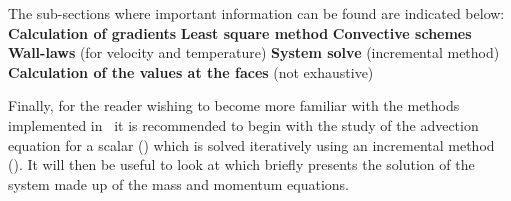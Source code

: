 The sub-sections where important information can be found are indicated
below:\newline
\newline
\nl \newline
\textbf{Calculation of gradients}\newline
\hspace*{1cm}\newline
\hspace*{1cm}\newline
\textbf{Least square method}\newline
\hspace*{1cm}\newline
\hspace*{1cm}\newline
\textbf{Convective schemes}\newline
\hspace*{1cm}\newline
\textbf{Wall-laws} (for velocity and temperature)\newline
\hspace*{1cm}\newline
\hspace*{1cm}\newline
\textbf{System solve} (incremental method)\newline
\hspace*{1cm}\newline
\textbf{Calculation of the values at the faces} (not exhaustive)\newline
\hspace*{1cm}\newline
\hspace*{1cm}\newline

Finally, for the reader wishing to become more familiar with the methods
implemented in \CS\, it is recommended to begin with the study of the
advection equation for a scalar () which is solved iteratively
using an incremental method (). It will then be useful to look
at  which briefly presents the solution of the system made up
of the mass and momentum equations.

